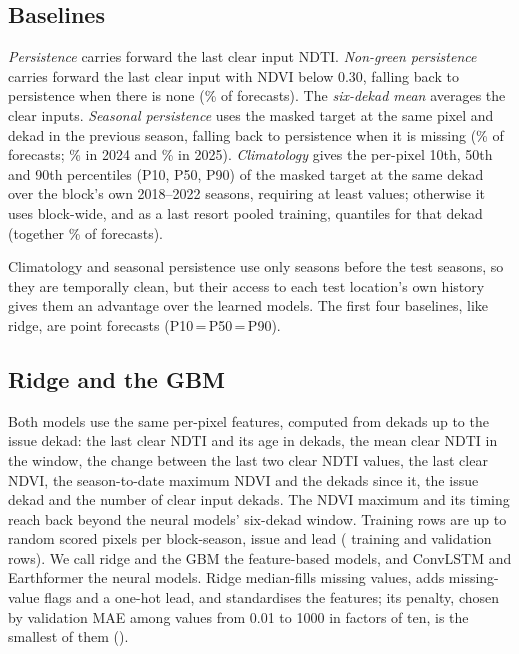 \documentclass[journal]{IEEEtran}
\begin{document}
\subsection{Baselines}
\label{sec:baselines}
\emph{Persistence} carries forward the last clear input NDTI. \emph{Non-green persistence} carries forward the last clear input with NDVI below 0.30, falling back to persistence when there is none (\finxFallbackPersNG\% of forecasts). The \emph{six-dekad mean} averages the clear inputs. \emph{Seasonal persistence} uses the masked target at the same pixel and dekad in the previous season, falling back to persistence when it is missing (\finxFallbackSeas\% of forecasts; \finxFallbackSeasTwentyFour\% in 2024 and \finxFallbackSeasTwentyFive\% in 2025). \emph{Climatology} gives the per-pixel 10th, 50th and 90th percentiles (P10, P50, P90) of the masked target at the same dekad over the block's own 2018--2022 seasons, requiring at least \finxClimMinYears{} values; otherwise it uses block-wide, and as a last resort pooled training, quantiles for that dekad (together \finxFallbackClim\% of forecasts).

Climatology and seasonal persistence use only seasons before the test seasons, so they are temporally clean, but their access to each test location's own history gives them an advantage over the learned models. The first four baselines, like ridge, are point forecasts (P10\,=\,P50\,=\,P90).

\subsection{Ridge and the GBM}
Both models use the same per-pixel features, computed from dekads up to the issue dekad: the last clear NDTI and its age in dekads, the mean clear NDTI in the window, the change between the last two clear NDTI values, the last clear NDVI, the season-to-date maximum NDVI and the dekads since it, the issue dekad and the number of clear input dekads. The NDVI maximum and its timing reach back beyond the neural models' six-dekad window. Training rows are up to \finxPerUnitPx{} random scored pixels per block-season, issue and lead (\finNTrainRows{} training and \finNValRows{} validation rows). We call ridge and the GBM the feature-based models, and ConvLSTM and Earthformer the neural models. Ridge median-fills missing values, adds missing-value flags and a one-hot lead, and standardises the features; its penalty, chosen by validation MAE among values from 0.01 to 1000 in factors of ten, is the smallest of them (\finRidgeAlpha).
\end{document}
